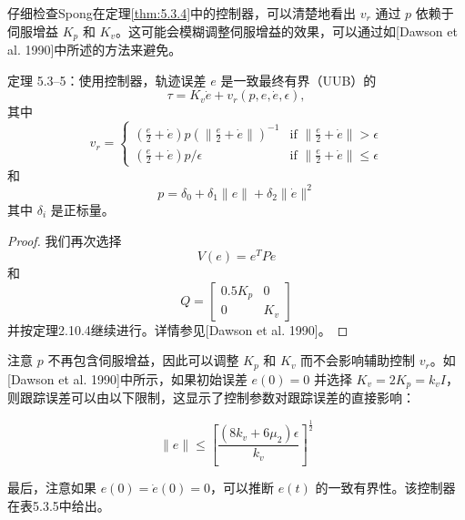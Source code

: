 \documentclass[UTF8,12pt,a4paper]{ctexart}
\begin{document}
仔细检查Spong在定理\ref{thm:5.3.4}中的控制器，可以清楚地看出 $v_r$ 通过 $p$ 依赖于伺服增益 $K_p$ 和 $K_v$。这可能会模糊调整伺服增益的效果，可以通过如[Dawson et al. 1990]中所述的方法来避免。

\begin{theorem}\label{thm:5.3.5}
定理 5.3--5：使用控制器，轨迹误差 $e$ 是一致最终有界（UUB）的
\begin{equation}
\tau = K_v \dot{e} + v_r(p, e, \dot{e}, \epsilon),
\end{equation}
其中
\begin{equation}
v_r = \begin{cases} \left(\frac{e}{2} + \dot{e}\right)p\left(\|\frac{e}{2} + \dot{e}\|\right)^{-1} & \text{if } \|\frac{e}{2} + \dot{e}\| > \epsilon \\ \left(\frac{e}{2} + \dot{e}\right)p/\epsilon & \text{if } \|\frac{e}{2} + \dot{e}\| \leq \epsilon \end{cases}
\end{equation}
和
\begin{equation}
p = \delta_0 + \delta_1\|e\| + \delta_2\|\dot{e}\|^2
\end{equation}
其中 $\delta_i$ 是正标量。
\end{theorem}

\begin{proof}
我们再次选择
\begin{equation}
V(e) = e^T P e
\end{equation}
和
\begin{equation}
Q = \begin{bmatrix} 0.5K_p & 0 \\ 0 & K_v \end{bmatrix}
\end{equation}
并按定理2.10.4继续进行。详情参见[Dawson et al. 1990]。
\end{proof}

注意 $p$ 不再包含伺服增益，因此可以调整 $K_p$ 和 $K_v$ 而不会影响辅助控制 $v_r$。如[Dawson et al. 1990]中所示，如果初始误差 $e(0) = 0$ 并选择 $K_v = 2K_p = k_v I$，则跟踪误差可以由以下限制，这显示了控制参数对跟踪误差的直接影响：

\begin{equation}\label{eq:5.3.15}
\|e\| \leq \left[\frac{(8k_v + 6\mu_2)\epsilon}{k_v}\right]^{\frac{1}{2}}
\end{equation}

最后，注意如果 $e(0) = \dot{e}(0) = 0$，可以推断 $e(t)$ 的一致有界性。该控制器在表5.3.5中给出。
\end{document}
